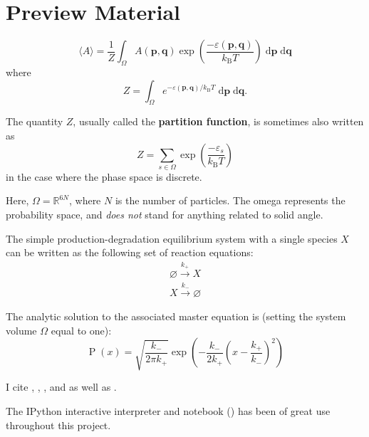 \documentclass[english,letterpaper,12pt]{article}
\newcommand{\dee}{\;\mathrm{d}}
\renewcommand{\vec}[1]{\ensuremath{\mathbf{#1}}}
\DeclareMathOperator{\Prob}{P}
\newcommand{\kB}{\ensuremath{k_\mathrm{B}}}
\begin{document}
\appendix
\section{Preview Material} %
\label{sec:preview-material}


\lipsum[1-2]



\begin{equation}
    \langle A \rangle = \frac{1}{Z} \int_\Omega A(\vec{p}, \vec{q}) \exp\left(\frac{-\varepsilon(\vec{p}, \vec{q})}{\kB T}\right) \dee \vec{p} \dee \vec{q}
\end{equation}
where
\begin{equation}
    Z = \int_\Omega e^{-\varepsilon(\vec{p}, \vec{q}) / \kB T}\dee \vec{p} \dee \vec{q}.
\end{equation}

The quantity $Z$, usually called the \textbf{partition function}, is sometimes also written as
\begin{equation}
    Z = \sum_{s \in \Omega} \exp\left( \frac{-\varepsilon_s}{\kB T} \right)
    \label{eq:partfun-discrete}
\end{equation}
in the case where the phase space is discrete.

Here, $\Omega = \mathbb{R}^{6N}$, where $N$ is the number of particles. The omega represents the probability space, and \emph{does not} stand for anything related to solid angle.

The simple production-degradation equilibrium system with a single species $X$ can be written as the following set of reaction equations:
\begin{align}
    \varnothing \xrightarrow{k_+} X \\
    X \xrightarrow {k_-} \varnothing
    \label{eq:prod-deg-rxn}
\end{align}

The analytic solution to the associated master equation is (setting the system volume $\Omega$ equal to one):
\begin{equation}
    \Prob(x) = \sqrt{\frac{k_-}{2\pi k_+}}\exp\left( -\frac{k_-}{2k_+} \left( x - \frac{k_+}{k_-} \right)^2 \right)
    \label{eq:prod-deg-ans}
\end{equation}

I cite \cite{bistable-modeling}, \cite{we-exact}, \cite{we-chemkin}, and \cite{delay-oscillations} as well as \cite{gillespie-ssa}.

The IPython interactive interpreter and notebook (\cite{PER-GRA:2007}) has been of great use throughout this project.

\lipsum[3-4]




\end{document}

